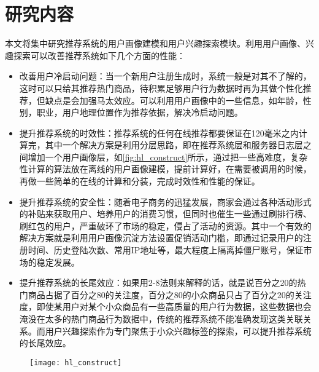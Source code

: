 	\section{研究内容}
	本文将集中研究推荐系统的用户画像建模和用户兴趣探索模块\citep{user-interest}。利用用户画像、兴趣探索可以改善推荐系统如下几个方面的性能：
		\begin{itemize}
			\item 改善用户冷启动问题：当一个新用户注册生成时，系统一般是对其不了解的，这时可以只给其推荐热门商品，待积累足够用户行为数据时再为其做个性化推荐，但缺点是会加强马太效应。可以利用用户画像中的一些信息，如年龄，性别，职业，用户地理位置作为推荐依据，解决冷启动问题\citep{cold-start}。
			\item 提升推荐系统的时效性：推荐系统的任何在线推荐都要保证在120毫米之内计算完，其中一个解决方案是利用分层思路，即在推荐系统层和服务器日志层之间增加一个用户画像层，如\autoref{fig:hl_construct}所示，通过把一些高难度，复杂性计算的算法放在离线的用户画像建模，提前计算好，在需要被调用的时候，再做一些简单的在线的计算和分装，完成时效性和性能的保证。
			\item 提升推荐系统的安全性：随着电子商务的迅猛发展，商家会通过各种活动形式的补贴来获取用户、培养用户的消费习惯，但同时也催生一些通过刷排行榜、刷红包的用户，严重破环了市场的稳定，侵占了活动的资源。其中一个有效的解决方案就是利用用户画像沉淀方法设置促销活动门槛，即通过记录用户的注册时间、历史登陆次数、常用IP地址等，最大程度上隔离掉僵尸账号，保证市场的稳定发展。
			\item 提升推荐系统的长尾效应：如果用2-8法则来解释的话，就是说百分之20的热门商品占据了百分之80的关注度，百分之80的小众商品只占了百分之20的关注度，即使某用户对某个小众商品有一些高质量的用户行为数据，这些数据也会淹没在太多的热门商品行为数据中，传统的推荐系统不能准确发现这类关联关系。而用户兴趣探索作为专门聚焦于小众兴趣标签的探索，可以提升推荐系统的长尾效应。
		\end{itemize}

		\begin{figure}
			\centering
			\texttt{[image: hl\_construct]}
			\label{fig:hl_construct}
		\end{figure}

